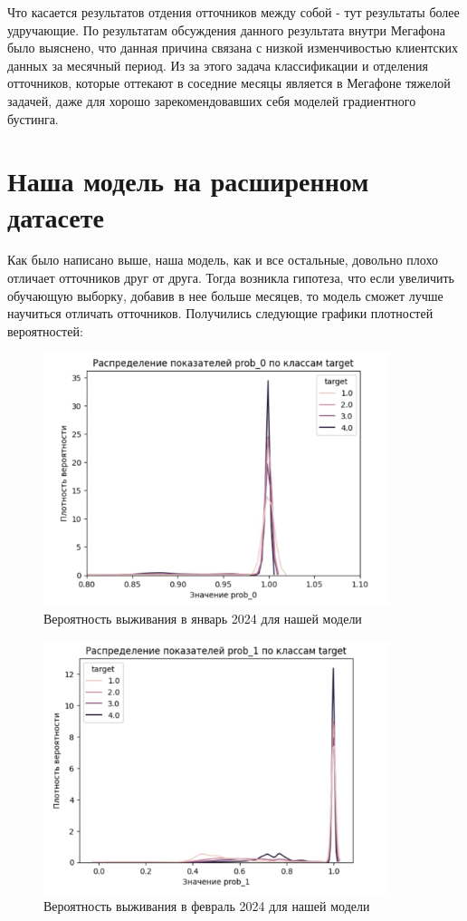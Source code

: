 \documentclass[a4paper,14pt,oneside,openany]{memoir}
\begin{document}
Что касается результатов отдения отточников между собой - тут результаты более удручающие. По результатам обсуждения данного результата внутри Мегафона было выяснено, что данная причина связана с низкой изменчивостью клиентских данных за месячный период. Из за этого задача классификации и отделения отточников, которые оттекают в соседние месяцы является в Мегафоне тяжелой задачей, даже для хорошо зарекомендовавших себя моделей градиентного бустинга. 

\section{Наша модель на расширенном датасете}

Как было написано выше, наша модель, как и все остальные, довольно плохо отличает отточников друг от друга. Тогда возникла гипотеза, что если увеличить обучающую выборку, добавив в нее больше месяцев, то модель сможет лучше научиться отличать отточников. Получились следующие графики плотностей вероятностей: 

\begin{figure}[H]
	\includegraphics[width=0.9\textwidth]{../figures/prob_0_ours.png}
	\caption{Вероятность выживания в январь 2024 для нашей модели}
\end{figure}

\begin{figure}[H]
	\includegraphics[width=0.9\textwidth]{../figures/prob_1_ours.png}
	\caption{Вероятность выживания в февраль 2024 для нашей модели}
\end{figure}
\end{document}
